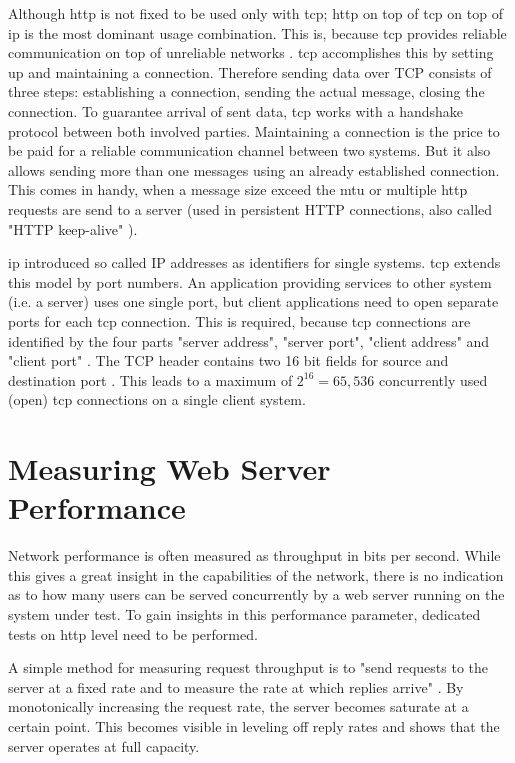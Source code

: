 Although \gls{http} is not fixed to be used only with \gls{tcp}; \gls{http} on top of \gls{tcp} on top of \gls{ip} is the most dominant usage combination. This is, because \gls{tcp} provides reliable communication on top of unreliable networks \cite{tcp}. \gls{tcp} accomplishes this by setting up and maintaining a connection. Therefore sending data over TCP consists of three steps: establishing a connection, sending the actual message, closing the connection. To guarantee arrival of sent data, \gls{tcp} works with a handshake protocol between both involved parties. Maintaining a connection is the price to be paid for a reliable communication channel between two systems. But it also allows sending more than one messages using an already established connection. This comes in handy, when a message size exceed the \gls{mtu} or multiple \gls{http} requests are send to a server (used in persistent HTTP connections, also called "HTTP keep-alive" \cite{http}).

\gls{ip} introduced so called IP addresses as identifiers for single systems. \gls{tcp} extends this model by port numbers. An application providing services to other system (i.e. a server) uses one single port, but client applications need to open separate ports for each \gls{tcp} connection. This is required, because \gls{tcp} connections are identified by the four parts "server address", "server port", "client address" and "client port" \cite{tcp}. The TCP header contains two 16 bit fields for source and destination port \cite{kn1}. This leads to a maximum of $2^{16} = 65,536$ concurrently used (open) \gls{tcp} connections on a single client system.

\section{Measuring Web Server Performance}

Network performance is often measured as throughput in bits per second. While this gives a great insight in the capabilities of the network, there is no indication as to how many users can be served concurrently by a web server running on the system under test. To gain insights in this performance parameter, dedicated tests on \gls{http} level need to be performed.

A simple method for measuring request throughput is to "send requests to the server at a fixed rate and to measure the rate at which replies arrive" \cite{httperf}. By monotonically increasing the request rate, the server becomes saturate  at a certain point. This becomes visible in leveling off reply rates and shows that the server operates at full capacity. \cite{httperf}

